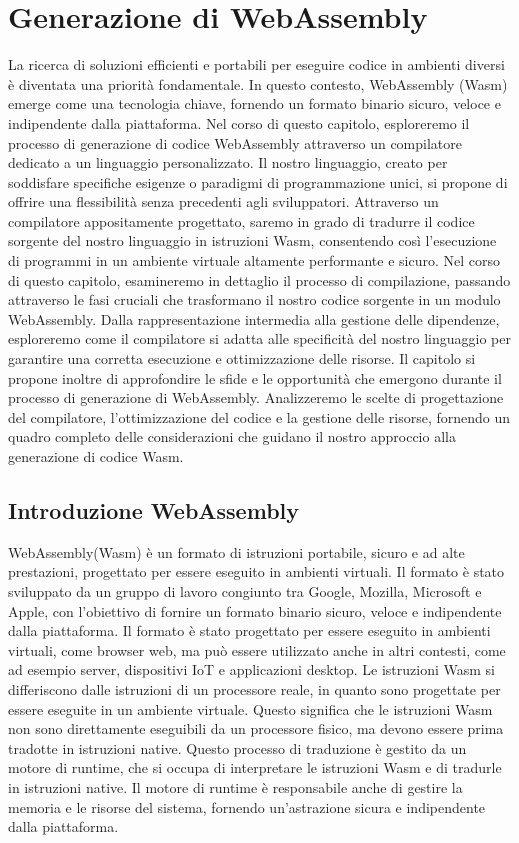 \documentclass[../../main.tex]{subfiles}
\begin{document}
\chapter{Generazione di WebAssembly}
La ricerca di soluzioni efficienti e portabili per eseguire codice in ambienti diversi è diventata una priorità fondamentale. In questo contesto, WebAssembly (Wasm) emerge come una tecnologia chiave, fornendo un formato binario sicuro, veloce e indipendente dalla piattaforma. Nel corso di questo capitolo, esploreremo il processo di generazione di codice WebAssembly attraverso un compilatore dedicato a un linguaggio personalizzato.
Il nostro linguaggio, creato per soddisfare specifiche esigenze o paradigmi di programmazione unici, si propone di offrire una flessibilità senza precedenti agli sviluppatori. Attraverso un compilatore appositamente progettato, saremo in grado di tradurre il codice sorgente del nostro linguaggio in istruzioni Wasm, consentendo così l'esecuzione di programmi in un ambiente virtuale altamente performante e sicuro.
Nel corso di questo capitolo, esamineremo in dettaglio il processo di compilazione, passando attraverso le fasi cruciali che trasformano il nostro codice sorgente in un modulo WebAssembly. Dalla rappresentazione intermedia alla gestione delle dipendenze, esploreremo come il compilatore si adatta alle specificità del nostro linguaggio per garantire una corretta esecuzione e ottimizzazione delle risorse.
Il capitolo si propone inoltre di approfondire le sfide e le opportunità che emergono durante il processo di generazione di WebAssembly. Analizzeremo le scelte di progettazione del compilatore, l'ottimizzazione del codice e la gestione delle risorse, fornendo un quadro completo delle considerazioni che guidano il nostro approccio alla generazione di codice Wasm.

\section{Introduzione WebAssembly}
WebAssembly(Wasm) \cite{WebAssemblyDoc} è un formato di istruzioni portabile, sicuro e ad alte prestazioni, progettato per essere eseguito in ambienti virtuali. Il formato è stato sviluppato da un gruppo di lavoro congiunto tra Google, Mozilla, Microsoft e Apple, con l'obiettivo di fornire un formato binario sicuro, veloce e indipendente dalla piattaforma. Il formato è stato progettato per essere eseguito in ambienti virtuali, come browser web, ma può essere utilizzato anche in altri contesti, come ad esempio server, dispositivi IoT e applicazioni desktop.
Le istruzioni Wasm si differiscono dalle istruzioni di un processore reale, in quanto sono progettate per essere eseguite in un ambiente virtuale. Questo significa che le istruzioni Wasm non sono direttamente eseguibili da un processore fisico, ma devono essere prima tradotte in istruzioni native. Questo processo di traduzione è gestito da un motore di runtime, che si occupa di interpretare le istruzioni Wasm e di tradurle in istruzioni native. Il motore di runtime è responsabile anche di gestire la memoria e le risorse del sistema, fornendo un'astrazione sicura e indipendente dalla piattaforma.
\end{document}

